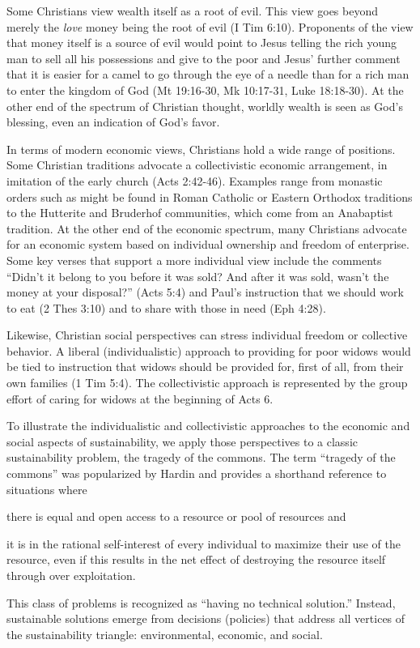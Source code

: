 \documentclass[12pt]{article}
\begin{document}
Some Christians view wealth itself as a root of evil. 
This view goes beyond merely the \emph{love} money
being the root of evil (I Tim 6:10). 
Proponents of the view that money itself is a source of evil would point to Jesus
telling the rich young man to sell all his possessions and give to the poor and 
Jesus' further comment that it is easier
for a camel to go through the eye of a needle than 
for a rich man to enter the kingdom of God (Mt 19:16-30, Mk 10:17-31, Luke 18:18-30). 
At the other end of the spectrum of Christian thought, 
worldly wealth is seen as God's blessing, 
even an indication of God's favor.

In terms of modern economic views, Christians hold a wide range of positions. 
Some Christian traditions advocate a
collectivistic economic arrangement, in imitation of the early church (Acts 2:42-46). 
Examples range from monastic orders such as
might be found in Roman Catholic or Eastern Orthodox traditions 
to the Hutterite and Bruderhof communities, 
which come from an Anabaptist tradition. 
At the other end of the economic spectrum, many Christians advocate for an economic system
based on individual ownership and freedom of enterprise. 
Some key verses that support a more individual view include the comments 
``Didn’t it belong to you before it was sold? And after it was sold, 
wasn’t the money at your disposal?'' (Acts 5:4) and 
Paul's instruction that we should work to eat (2 Thes 3:10) and to share with those in need (Eph 4:28).

Likewise, Christian social perspectives can stress individual freedom or collective behavior.
A liberal (individualistic) approach to providing for poor widows 
would be tied to instruction that widows should be 
provided for, first of all, from their own families (1 Tim 5:4). 
The collectivistic approach is represented by the group effort of caring for widows 
at the beginning of Acts 6.

To illustrate the individualistic and collectivistic approaches to the economic and social 
aspects of sustainability, 
we apply those perspectives to a classic sustainability problem, 
the tragedy of the commons. 
The term ``tragedy of the commons'' was popularized by Hardin \autocite{Hardin68} 
and provides a shorthand reference to situations where 
%
\begin{enumerate*}[label={(\alph*)}]

  \item there is equal and open access to a resource or pool of resources and

  \item it is in the rational self-interest of
		every individual to maximize their use of the resource, even if this results in the net effect of destroying the
		resource itself through over exploitation.

\end{enumerate*}
% 
This class of problems is recognized as ``having no technical solution.''
Instead, sustainable solutions emerge from decisions (policies) 
that address all vertices of the sustainability triangle:
environmental, economic, and social.
\end{document}

